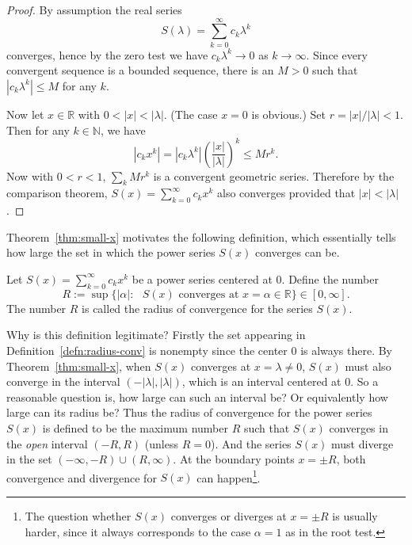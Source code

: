 \documentclass[11pt]{article}
\begin{document}
\begin{proof}
  By assumption the real series
  \[
    S(\lambda) = \sum_{k=0}^\infty c_k \lambda^k
  \]
  converges, hence by the zero test we have $c_k \lambda^k \to 0$ as $k \to \infty$.
  Since every convergent sequence is a bounded sequence, there is an $M > 0$ such that $|c_k \lambda^k| \leqslant M$ for any $k$.

  Now let $x \in \mathbb{R}$ with $0< |x| < |\lambda|$. (The case $x=0$ is obvious.)
  Set $r = |x| / |\lambda| < 1$.  Then for any $k \in \mathbb{N}$, we have
  \[
    |c_k x^k| = |c_k \lambda^k| \left( \frac{|x|}{|\lambda|} \right)^k \leqslant M r^k.
  \]
  Now with $0 < r < 1$, $\sum_k M r^k$ is a convergent geometric series.
  Therefore by the comparison theorem, $S(x) = \sum_{k=0}^\infty c_k x^k$ also converges provided that $|x| < |\lambda|$.
\end{proof}

Theorem~\ref{thm:small-x} motivates the following definition, which essentially tells how large the set in which the power series $S(x)$ converges can be.

\begin{defn}
  \label{defn:radius-conv}
  Let $S(x) = \sum_{k=0}^\infty c_k x^k$ be a power series centered at $0$.
  Define the number
  \[
    R := \sup \{ |\alpha| \colon \text{ $S(x)$ converges at $x = \alpha \in \mathbb{R}$} \} \in [0, \infty].
  \]
  The number $R$ is called the \textsf{radius of convergence} for the series $S(x)$.
\end{defn}

Why is this definition legitimate?
Firstly the set appearing in Definition~\ref{defn:radius-conv} is nonempty since the center $0$ is always there.
By Theorem~\ref{thm:small-x}, when $S(x)$ converges at $x = \lambda \ne 0$, $S(x)$ must also converge in the interval $(-|\lambda|, |\lambda|)$, which is an interval centered at $0$.
So a reasonable question is, how large can such an interval be? Or equivalently how large can its radius be?
Thus the radius of convergence for the power series $S(x)$ is defined to be the maximum number $R$ such that $S(x)$ converges in the \textit{open} interval $(-R, R)$ (unless $R=0$).
And the series $S(x)$ must diverge in the set $(-\infty, -R) \cup (R, \infty)$.
At the boundary points $x = \pm R$, both convergence and divergence for $S(x)$ can happen\footnote{The question whether $S(x)$ converges or diverges at $x = \pm R$ is usually harder, since it always corresponds to the case $\alpha = 1$ as in the root test.}.
\end{document}
